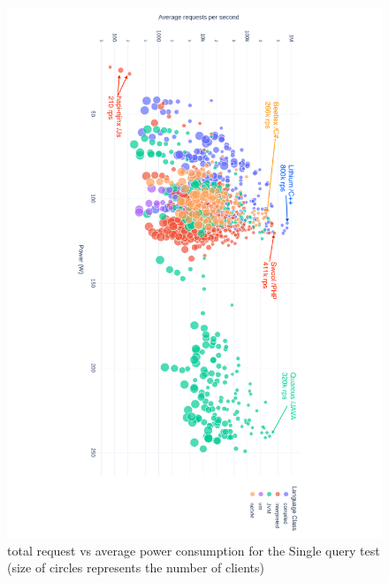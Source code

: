 \begin{figure}[hbt]
    \caption{total request vs average power consumption for the Single query test (size of circles represents the number of clients) }
    \label{fig:power_requests_query}
    \includegraphics[height=\textwidth,width=\textheight,keepaspectratio,angle=9
        0]{imgs/power_requests_query_log}

\end{figure}

